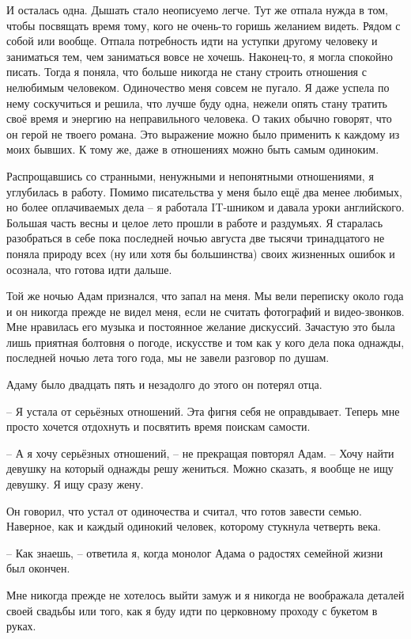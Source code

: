 \documentclass[
]{book}
\begin{document}
И осталась одна. Дышать стало неописуемо легче. Тут же отпала нужда в том, чтобы посвящать время тому, кого не очень-то горишь желанием видеть. Рядом с собой или вообще. Отпала потребность идти на уступки другому человеку и заниматься тем, чем заниматься вовсе не хочешь. Наконец-то, я могла спокойно писать. Тогда я поняла, что больше никогда не стану строить отношения с нелюбимым человеком. Одиночество меня совсем не пугало. Я даже успела по нему соскучиться и решила, что лучше буду одна, нежели опять стану тратить своё время и энергию на неправильного человека. О таких обычно говорят, что он герой не твоего романа. Это выражение можно было применить к каждому из моих бывших. К тому же, даже в отношениях можно быть самым одиноким.

Распрощавшись со странными, ненужными и непонятными отношениями, я углубилась в работу. Помимо писательства у меня было ещё два менее любимых, но более оплачиваемых дела -- я работала IT-шником и давала уроки английского. Большая часть весны и целое лето прошли в работе и раздумьях. Я старалась разобраться в себе пока последней ночью августа две тысячи тринадцатого не поняла природу всех (ну или хотя бы большинства) своих жизненных ошибок и осознала, что готова идти дальше.

Той же ночью Адам признался, что запал на меня. Мы вели переписку около года и он никогда прежде не видел меня, если не считать фотографий и видео-звонков. Мне нравилась его музыка и постоянное желание дискуссий. Зачастую это была лишь приятная болтовня о погоде, искусстве и том как у кого дела пока однажды, последней ночью лета того года, мы не завели разговор по душам.

Адаму было двадцать пять и незадолго до этого он потерял отца.

-- Я устала от серьёзных отношений. Эта фигня себя не оправдывает. Теперь мне просто хочется отдохнуть и посвятить время поискам самости.

-- А я хочу серьёзных отношений, -- не прекращая повторял Адам. -- Хочу найти девушку на который однажды решу жениться. Можно сказать, я вообще не ищу девушку. Я ищу сразу жену.

Он говорил, что устал от одиночества и считал, что готов завести семью. Наверное, как и каждый одинокий человек, которому стукнула четверть века.

-- Как знаешь, -- ответила я, когда монолог Адама о радостях семейной жизни был окончен.

Мне никогда прежде не хотелось выйти замуж и я никогда не воображала деталей своей свадьбы или того, как я буду идти по церковному проходу с букетом в руках.
\end{document}
